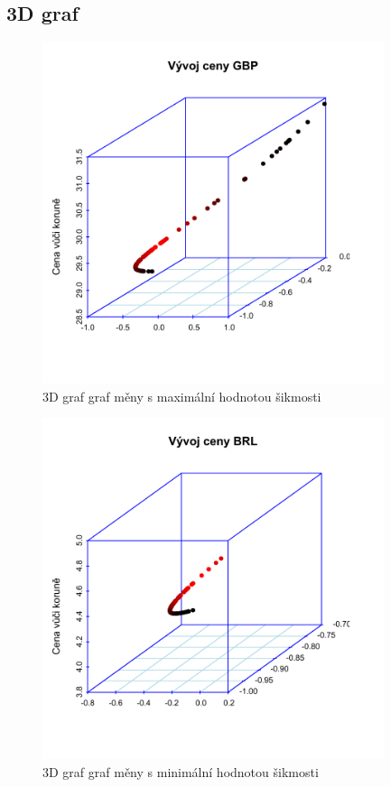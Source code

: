 \documentclass[a4paper]{ article}
\begin{document}
\subsection{3D graf}
\begin{figure}[H]
\centering
\includegraphics[width=10cm]{3D_graf_max.pdf}
\caption{3D graf graf měny s maximální hodnotou šikmosti}
\end{figure}
\begin{figure}[H]
\centering
\includegraphics[width=10cm]{3D_graf_min.pdf}
\caption{3D graf graf měny s minimální hodnotou šikmosti}
\end{figure}
\end{document}
